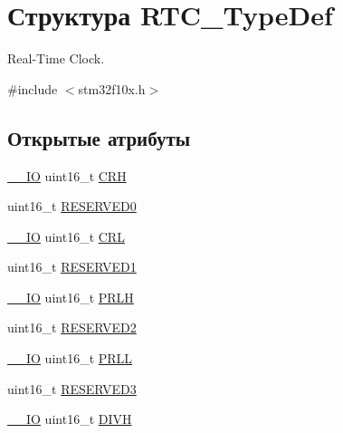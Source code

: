 \hypertarget{struct_r_t_c___type_def}{}\section{Структура R\+T\+C\+\_\+\+Type\+Def}
\label{struct_r_t_c___type_def}


Real-\/\+Time Clock.  




{\ttfamily \#include $<$stm32f10x.\+h$>$}

\subsection*{Открытые атрибуты}
\begin{DoxyCompactItemize}
\item 
\mbox{\hyperlink{group___c_m_s_i_s___c_m3__core__definitions_gaec43007d9998a0a0e01faede4133d6be}{\+\_\+\+\_\+\+IO}} uint16\+\_\+t \mbox{\hyperlink{struct_r_t_c___type_def_aad5162f4b5b15deb174479e8e543db82}{C\+RH}}
\item 
uint16\+\_\+t \mbox{\hyperlink{struct_r_t_c___type_def_a6d55bb337c409f849725a774364ce3bc}{R\+E\+S\+E\+R\+V\+E\+D0}}
\item 
\mbox{\hyperlink{group___c_m_s_i_s___c_m3__core__definitions_gaec43007d9998a0a0e01faede4133d6be}{\+\_\+\+\_\+\+IO}} uint16\+\_\+t \mbox{\hyperlink{struct_r_t_c___type_def_a95b9e1ed044a4e1cc3632326e7250767}{C\+RL}}
\item 
uint16\+\_\+t \mbox{\hyperlink{struct_r_t_c___type_def_a8a152da628dbdba2e849adf196fa341a}{R\+E\+S\+E\+R\+V\+E\+D1}}
\item 
\mbox{\hyperlink{group___c_m_s_i_s___c_m3__core__definitions_gaec43007d9998a0a0e01faede4133d6be}{\+\_\+\+\_\+\+IO}} uint16\+\_\+t \mbox{\hyperlink{struct_r_t_c___type_def_a831b0b55bae7921faa7d16c6f3160449}{P\+R\+LH}}
\item 
uint16\+\_\+t \mbox{\hyperlink{struct_r_t_c___type_def_aaa77e68ac9af2be5c095c05a50efe2e4}{R\+E\+S\+E\+R\+V\+E\+D2}}
\item 
\mbox{\hyperlink{group___c_m_s_i_s___c_m3__core__definitions_gaec43007d9998a0a0e01faede4133d6be}{\+\_\+\+\_\+\+IO}} uint16\+\_\+t \mbox{\hyperlink{struct_r_t_c___type_def_a03cf96aff11c288096d30a66afd19899}{P\+R\+LL}}
\item 
uint16\+\_\+t \mbox{\hyperlink{struct_r_t_c___type_def_a5489f7c3119b8e7b55d77a465baf223a}{R\+E\+S\+E\+R\+V\+E\+D3}}
\item 
\mbox{\hyperlink{group___c_m_s_i_s___c_m3__core__definitions_gaec43007d9998a0a0e01faede4133d6be}{\+\_\+\+\_\+\+IO}} uint16\+\_\+t \mbox{\hyperlink{struct_r_t_c___type_def_a224b675d0ecad8b6e26d9e4c32691a18}{D\+I\+VH}}

\end{DoxyCompactItemize}
